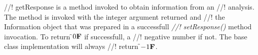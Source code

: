 //! getResponse is a method invoked to obtain information from an
//! analysis. The method is invoked with the integer argument returned and
//! the Information object that was prepared in a successfull {\em
//! setResponse()} method invocation. To return \f$0{\bf F}$ if successfull, a
//! negative number if not. The base class implementation will always
//! return \f$-1{\bf F}$. 
